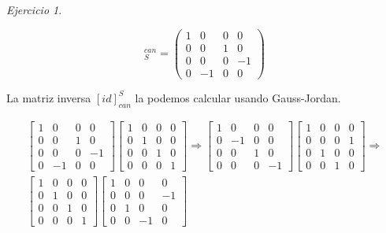 \documentclass[11pt,a4paper]{article}
\theoremstyle{definition}
\theoremstyle{remark}
\newtheorem{exc}{Ejercicio}
\begin{document}
\begin{exc}
\begin{enumerate}
			\begin{equation}
			[id]_{S}^{can}= 
			\begin{pmatrix}
			1 & 0 & 0 & 0
			\\ 0 & 0 & 1 & 0  
			\\ 0 & 0 & 0 & -1
			\\ 0 & -1 & 0 & 0
			\end{pmatrix} \nonumber
			\end{equation}
			
			La matriz inversa $ [id]_{can}^{S} $ la podemos calcular usando Gauss-Jordan.
			
			\begin{multline}
			\begin{bmatrix}
			1 & 0 & 0 & 0
			\\ 0 & 0 & 1 & 0  
			\\ 0 & 0 & 0 & -1
			\\ 0 & -1 & 0 & 0
			\end{bmatrix}
			\begin{bmatrix}
			1 & 0 & 0 & 0
			\\ 0 & 1 & 0 & 0  
			\\ 0 & 0 & 1 & 0
			\\ 0 & 0 & 0 & 1
			\end{bmatrix}
			\nonumber \Rightarrow 
			\begin{bmatrix}
			1 & 0 & 0 & 0
			\\ 0 & -1 & 0 & 0
			\\ 0 & 0 & 1 & 0  
			\\ 0 & 0 & 0 & -1
			\end{bmatrix}
			\begin{bmatrix}
			1 & 0 & 0 & 0
			\\ 0 & 0 & 0 & 1
			\\ 0 & 1 & 0 & 0  
			\\ 0 & 0 & 1 & 0
			\end{bmatrix} \Rightarrow
			\\ 
			\begin{bmatrix}
			1 & 0 & 0 & 0
			\\ 0 & 1 & 0 & 0
			\\ 0 & 0 & 1 & 0  
			\\ 0 & 0 & 0 & 1
			\end{bmatrix}
			\begin{bmatrix}
			1 & 0 & 0 & 0
			\\ 0 & 0 & 0 & -1
			\\ 0 & 1 & 0 & 0  
			\\ 0 & 0 & -1 & 0
			\end{bmatrix}
			\end{multline}
			

\end{enumerate}
\end{exc}
\end{document}
